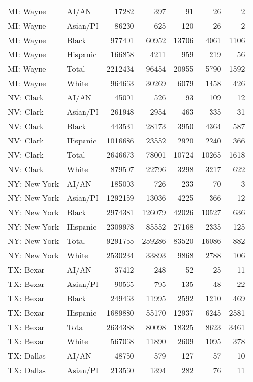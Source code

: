 \begin{table}[ht]
\begin{tabular}{llrrrrr}
  MI: Wayne & AI/AN & 17282 & 397 & 91 & 26 & 2 \\ 
  MI: Wayne & Asian/PI & 86230 & 625 & 120 & 26 & 2 \\ 
  MI: Wayne & Black & 977401 & 60952 & 13706 & 4061 & 1106 \\ 
  MI: Wayne & Hispanic & 166858 & 4211 & 959 & 219 & 56 \\ 
  MI: Wayne & Total & 2212434 & 96454 & 20955 & 5790 & 1592 \\ 
  MI: Wayne & White & 964663 & 30269 & 6079 & 1458 & 426 \\ 
  NV: Clark & AI/AN & 45001 & 526 & 93 & 109 & 12 \\ 
  NV: Clark & Asian/PI & 261948 & 2954 & 463 & 335 & 31 \\ 
  NV: Clark & Black & 443531 & 28173 & 3950 & 4364 & 587 \\ 
  NV: Clark & Hispanic & 1016686 & 23552 & 2920 & 2240 & 366 \\ 
  NV: Clark & Total & 2646673 & 78001 & 10724 & 10265 & 1618 \\ 
  NV: Clark & White & 879507 & 22796 & 3298 & 3217 & 622 \\ 
  NY: New York & AI/AN & 185003 & 726 & 233 & 70 & 3 \\ 
  NY: New York & Asian/PI & 1292159 & 13036 & 4225 & 366 & 12 \\ 
  NY: New York & Black & 2974381 & 126079 & 42026 & 10527 & 636 \\ 
  NY: New York & Hispanic & 2309978 & 85552 & 27168 & 2335 & 125 \\ 
  NY: New York & Total & 9291755 & 259286 & 83520 & 16086 & 882 \\ 
  NY: New York & White & 2530234 & 33893 & 9868 & 2788 & 106 \\ 
  TX: Bexar & AI/AN & 37412 & 248 & 52 & 25 & 11 \\ 
  TX: Bexar & Asian/PI & 90565 & 795 & 135 & 48 & 22 \\ 
  TX: Bexar & Black & 249463 & 11995 & 2592 & 1210 & 469 \\ 
  TX: Bexar & Hispanic & 1689880 & 55170 & 12937 & 6245 & 2581 \\ 
  TX: Bexar & Total & 2634388 & 80098 & 18325 & 8623 & 3461 \\ 
  TX: Bexar & White & 567068 & 11890 & 2609 & 1095 & 378 \\ 
  TX: Dallas & AI/AN & 48750 & 579 & 127 & 57 & 10 \\ 
  TX: Dallas & Asian/PI & 213560 & 1394 & 282 & 76 & 11 \\ 

\end{tabular}
\end{table}
